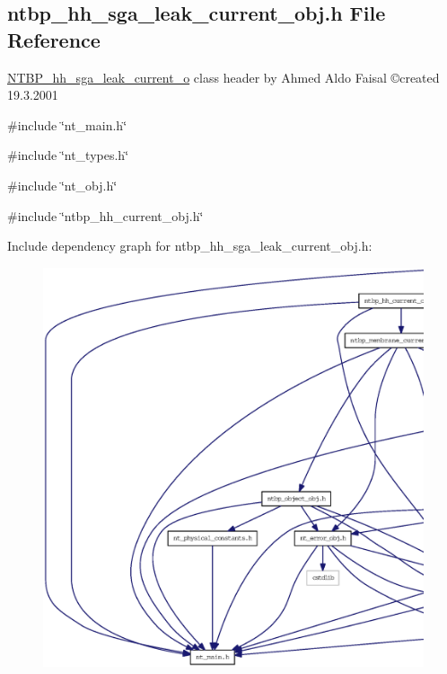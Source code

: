 \subsection{ntbp\_\-hh\_\-sga\_\-leak\_\-current\_\-obj.h File Reference}
\label{ntbp__hh__sga__leak__current__obj_8h}



\begin{DoxyItemize}
\item \hyperlink{class_n_t_b_p__hh__sga__leak__current__o}{NTBP\_\-hh\_\-sga\_\-leak\_\-current\_\-o} class header by Ahmed Aldo Faisal \copyright created 19.3.2001 
\end{DoxyItemize} 


{\ttfamily \#include \char`\"{}nt\_\-main.h\char`\"{}}\par
{\ttfamily \#include \char`\"{}nt\_\-types.h\char`\"{}}\par
{\ttfamily \#include \char`\"{}nt\_\-obj.h\char`\"{}}\par
{\ttfamily \#include \char`\"{}ntbp\_\-hh\_\-current\_\-obj.h\char`\"{}}\par
Include dependency graph for ntbp\_\-hh\_\-sga\_\-leak\_\-current\_\-obj.h:
\nopagebreak
\begin{figure}[H]
\begin{center}
\leavevmode
\includegraphics[width=400pt]{ntbp__hh__sga__leak__current__obj_8h__incl}
\end{center}
\end{figure}
